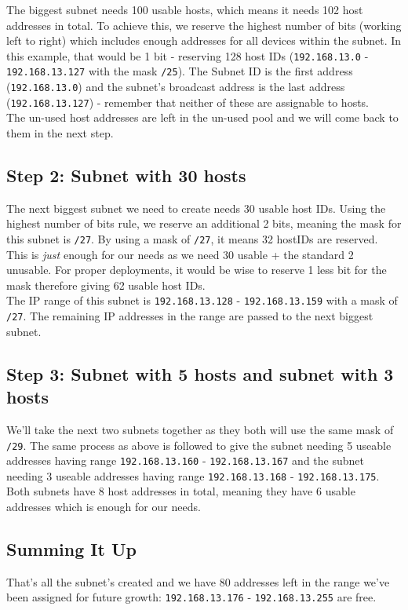 The biggest subnet needs 100 usable hosts, which means it needs 102 host addresses in total. To achieve this, we reserve the highest number of bits (working left to right) which includes enough addresses for all devices within the subnet. In this example, that would be 1 bit - reserving 128 host IDs (\verb|192.168.13.0| - \verb|192.168.13.127| with the mask \verb|/25|). The Subnet ID is the first address (\verb|192.168.13.0|) and the subnet's broadcast address is the last address (\verb|192.168.13.127|) - remember that neither of these are assignable to hosts.\\

The un-used host addresses are left in the un-used pool and we will come back to them in the next step.

\subsection{Step 2: Subnet with 30 hosts}
The next biggest subnet we need to create needs 30 usable host IDs. Using the highest number of bits rule, we reserve an additional 2 bits, meaning the mask for this subnet is \verb|/27|. By using a mask of \verb|/27|, it means 32 hostIDs are reserved. This is \textit{just} enough for our needs as we need 30 usable + the standard 2 unusable. For proper deployments, it would be wise to reserve 1 less bit for the mask therefore giving 62 usable host IDs.\\

The IP range of this subnet is \verb|192.168.13.128| - \verb|192.168.13.159| with a mask of \verb|/27|. The remaining IP addresses in the range are passed to the next biggest subnet.

\subsection{Step 3: Subnet with 5 hosts and subnet with 3 hosts}
We'll take the next two subnets together as they both will use the same mask of \verb|/29|. The same process as above is followed to give the subnet needing 5 useable addresses having range \verb|192.168.13.160| - \verb|192.168.13.167| and the subnet needing 3 useable addresses having range \verb|192.168.13.168| - \verb|192.168.13.175|. Both subnets have 8 host addresses in total, meaning they have 6 usable addresses which is enough for our needs.

\subsection{Summing It Up}
That's all the subnet's created and we have 80 addresses left in the range we've been assigned for future growth: \verb|192.168.13.176| - \verb|192.168.13.255| are free. 

